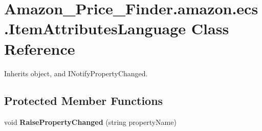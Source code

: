 \hypertarget{class_amazon___price___finder_1_1amazon_1_1ecs_1_1_item_attributes_language}{\section{Amazon\-\_\-\-Price\-\_\-\-Finder.\-amazon.\-ecs.\-Item\-Attributes\-Language Class Reference}
\label{class_amazon___price___finder_1_1amazon_1_1ecs_1_1_item_attributes_language}
}


 




Inherits object, and I\-Notify\-Property\-Changed.

\subsection*{Protected Member Functions}
\begin{DoxyCompactItemize}
\item 
\hypertarget{class_amazon___price___finder_1_1amazon_1_1ecs_1_1_item_attributes_language_acf2c54317be084c15f93a7ae50e6cb3b}{void {\bfseries Raise\-Property\-Changed} (string property\-Name)}\label{class_amazon___price___finder_1_1amazon_1_1ecs_1_1_item_attributes_language_acf2c54317be084c15f93a7ae50e6cb3b}

\end{DoxyCompactItemize}
